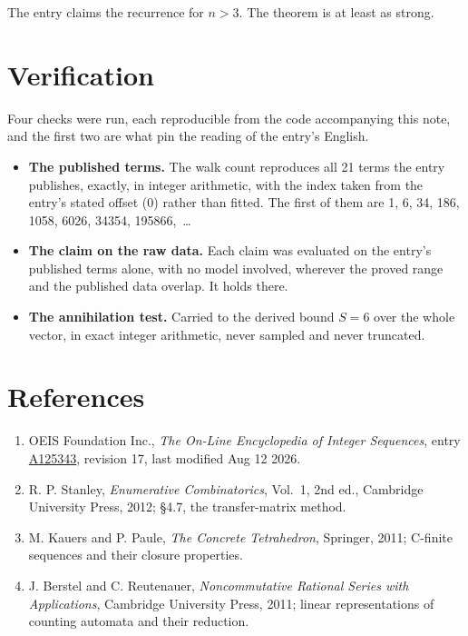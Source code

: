 \documentclass[11pt]{article}
\theoremstyle{definition}
\begin{document}
The entry claims the recurrence for $n > 3$. The theorem is at least as strong.

\section{Verification}

Four checks were run, each reproducible from the code accompanying this note, and the first two are what pin the reading of the entry's English.

\begin{itemize}

\item {\bfseries The published terms.} The walk count reproduces all 21 terms the entry publishes, exactly, in integer arithmetic, with the index taken from the entry's stated offset (0) rather than fitted. The first of them are 1, 6, 34, 186, 1058, 6026, 34354, 195866,~\dots

\item {\bfseries The claim on the raw data.} Each claim was evaluated on the entry's published terms alone, with no model involved, wherever the proved range and the published data overlap. It holds there.

\item {\bfseries The annihilation test.} Carried to the derived bound $S = 6$ over the whole vector, in exact integer arithmetic, never sampled and never truncated.

\end{itemize}

\section{References}

\begin{enumerate}

\item OEIS Foundation Inc., \emph{The On-Line Encyclopedia of Integer Sequences}, entry \href{https://oeis.org/A125343}{A125343}, revision 17, last modified Aug 12 2026.

\item R. P. Stanley, \emph{Enumerative Combinatorics}, Vol.~1, 2nd ed., Cambridge University Press, 2012; \S4.7, the transfer-matrix method.

\item M. Kauers and P. Paule, \emph{The Concrete Tetrahedron}, Springer, 2011; C-finite sequences and their closure properties.

\item J. Berstel and C. Reutenauer, \emph{Noncommutative Rational Series with Applications}, Cambridge University Press, 2011; linear representations of counting automata and their reduction.

\end{enumerate}
\end{document}
